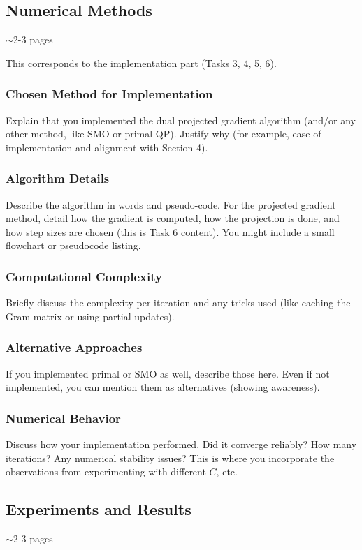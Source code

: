 \subsection{Numerical Methods}
$\sim$2-3 pages

This corresponds to the implementation part (Tasks 3, 4, 5, 6).

\subsubsection{Chosen Method for Implementation}
Explain that you implemented the dual projected gradient algorithm (and/or any other method, like SMO or primal QP). Justify why (for example, ease of implementation and alignment with Section 4).

\subsubsection{Algorithm Details}
Describe the algorithm in words and pseudo-code. For the projected gradient method, detail how the gradient is computed, how the projection is done, and how step sizes are chosen (this is Task 6 content). You might include a small flowchart or pseudocode listing.

\subsubsection{Computational Complexity}
Briefly discuss the complexity per iteration and any tricks used (like caching the Gram matrix or using partial updates).

\subsubsection{Alternative Approaches}
If you implemented primal or SMO as well, describe those here. Even if not implemented, you can mention them as alternatives (showing awareness).

\subsubsection{Numerical Behavior}
Discuss how your implementation performed. Did it converge reliably? How many iterations? Any numerical stability issues? This is where you incorporate the observations from experimenting with different $C$, etc.

\subsection{Experiments and Results}
$\sim$2-3 pages

